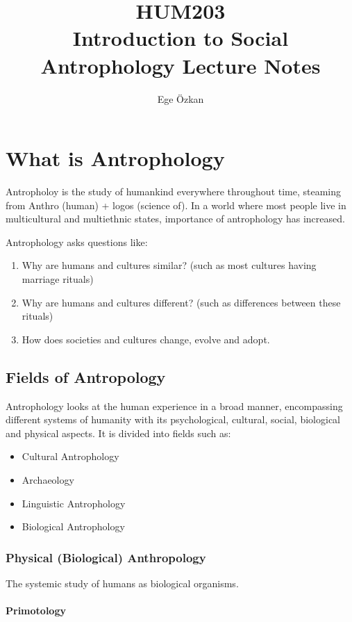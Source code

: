 \documentclass[11pt,a4paper]{book}
\author{Ege Özkan}
\title{HUM203 \\ \large{Introduction to Social Antrophology Lecture Notes}}
\begin{document}
\newcommand{\unsure}{\textit{(?\textsuperscript{*})}}
\newcommand{\missed}{\textit{(!\textsuperscript{*})}}
\maketitle
\chapter{What is Antrophology}
Antropholoy is the study of humankind everywhere throughout time, steaming from Anthro (human) + logos (science of). In a world where most people live in multicultural and multiethnic states, importance of antrophology has increased.

Antrophology asks questions like:

\begin{enumerate}
\item Why are humans and cultures similar? (such as most cultures having marriage rituals)
\item Why are humans and cultures different? (such as differences between these rituals)
\item How does societies and cultures change, evolve and adopt.
\end{enumerate}

\section{Fields of Antropology}

Antrophology looks at the human experience in a broad manner, encompassing different systems of humanity with its psychological, cultural, social, biological and physical aspects. It is divided into fields such as:


\begin{itemize}
\item Cultural Antrophology
\item Archaeology
\item Linguistic Antrophology
\item Biological Antrophology
\end{itemize}

\subsection{Physical (Biological) Anthropology}

The systemic study of humans as biological organisms.

\subsubsection{Primotology}
\end{document}
